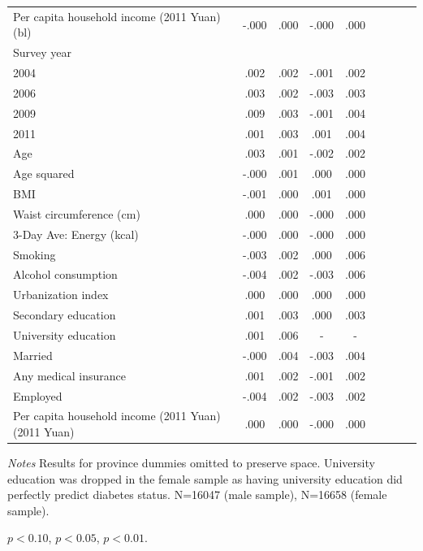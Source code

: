 \begin{table}[p]
\begin{center}
\begin{adjustbox}{max width=\linewidth}
\begin{threeparttable}
{\begin{tabular}{l*{4}{S S}}
Per capita household income (2011 Yuan) (bl)&-.000 &.000         &-.000 &.000         \\
Survey year && \\
\hspace*{10mm}2004&.002 &.002         &-.001 &.002         \\
\hspace*{10mm}2006&.003 &.002         &-.003 &.003         \\
\hspace*{10mm}2009&.009\sym{***} &.003         &-.001 &.004         \\
\hspace*{10mm}2011&.001 &.003         &.001 &.004         \\
Age           &.003\sym{**} &.001         &-.002 &.002         \\
Age squared        &-.000\sym{**} &.001         &.000 &.000         \\
BMI          &-.001 &.000        &.001\sym{**} &.000         \\
Waist circumference (cm)         &.000 &.000         &-.000 &.000         \\
3-Day Ave: Energy (kcal)        &-.000 &.000         &-.000 &.000         \\
Smoking         &-.003 &.002         &.000 &.006         \\
Alcohol consumption        &-.004\sym{**} &.002         &-.003 &.006         \\
Urbanization index         &.000 &.000         &.000 &.000         \\
Secondary education     &.001 &.003         &.000 &.003         \\
University education    &.001 &.006         & - & -         \\
Married       &-.000 &.004         &-.003 &.004         \\
Any medical insurance     &.001 &.002         &-.001 &.002         \\
Employed         &-.004\sym{**} &.002         &-.003 &.002         \\
Per capita household income (2011 Yuan) (2011 Yuan) &.000 &.000         &-.000 &.000         \\
\bottomrule
\end{tabular}
\begin{tablenotes}
\item \textit{Notes} Results for province dummies omitted to preserve space. University education was dropped in the female sample as having university education did perfectly predict diabetes status. N=16047 (male sample), N=16658 (female sample). \item \sym{*} \(p<0.10\), \sym{**} \(p<0.05\), \sym{***} \(p<0.01\). \\
\end{tablenotes}
}
\end{threeparttable}

\end{adjustbox}
\end{center}
\end{table}
